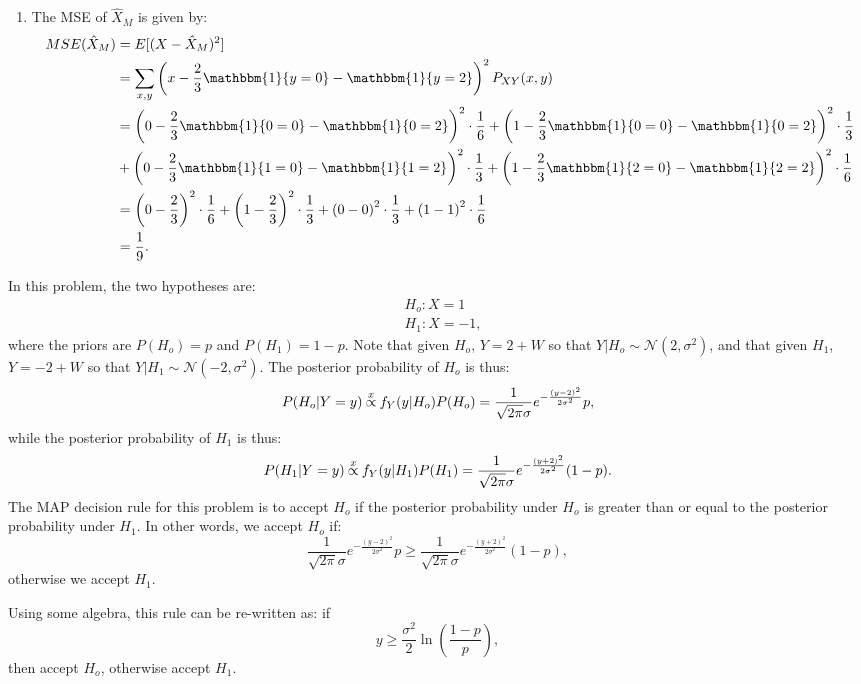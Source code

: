 \begin{problem}{12}
\begin{enumerate}
\item The MSE of $\hat X_M$ is given by:
\begin{align*}
MSE(\hat X_M) & = E[(X-\hat X_M)^2] \\
& = \sum_{x, y} \left ( x-\frac{2}{3} \mathbbm{1} \{ y=0\} - \mathbbm{1} \{ y=2\}\right)^2P_{XY}(x, y) \\
& = \left (0-\frac{2}{3} \mathbbm{1} \{ 0=0\} - \mathbbm{1} \{ 0=2\} \right)^2 \cdot \frac{1}{6}+\left (1-\frac{2}{3} \mathbbm{1} \{ 0=0\} - \mathbbm{1} \{ 0=2\} \right)^2 \cdot \frac{1}{3} \\
&+ \left (0-\frac{2}{3} \mathbbm{1} \{ 1=0\} - \mathbbm{1} \{ 1=2\} \right)^2 \cdot \frac{1}{3} + \left (1-\frac{2}{3} \mathbbm{1} \{ 2=0\} - \mathbbm{1} \{ 2=2\} \right)^2 \cdot \frac{1}{6} \\
& = \left(0-\frac{2}{3} \right)^2\cdot \frac{1}{6}+\left(1-\frac{2}{3} \right)^2\cdot \frac{1}{3}+\left(0-0 \right)^2\cdot \frac{1}{3}+\left(1-1 \right)^2\cdot \frac{1}{6} \\
& = \frac{1}{9}.
\end{align*}



\end{enumerate}
\end{problem}

\begin{problem}{13}  In this problem, the two hypotheses are:
\begin{align*}
&H_o: X=1 \\
&H_1:X=-1,
\end{align*}
where the priors are $P(H_o)=p$ and $P(H_1)=1-p$.  Note that given $H_o$, $Y= 2 +W$ so that $Y|H_o \sim \mathcal N(2, \sigma^2)$, and that given $H_1$, $Y= -2 +W$ so that $Y|H_1 \sim \mathcal N(-2, \sigma^2)$.  The posterior probability of $H_o$ is thus:
\begin{equation*}
P(H_o|Y=y) \propof{x} f_Y(y|H_o)P(H_o) = \frac{1}{\sqrt{2\pi}\sigma}e^{-\frac{(y-2)^2}{2\sigma^2}}p,
\end{equation*}
while the posterior probability of $H_1$ is thus:
\begin{equation*}
P(H_1|Y=y) \propof{x} f_Y(y|H_1)P(H_1) = \frac{1}{\sqrt{2\pi}\sigma}e^{-\frac{(y+2)^2}{2\sigma^2}}(1-p).
\end{equation*}
The MAP decision rule for this problem is to accept $H_o$ if the posterior probability under $H_o$ is greater than or equal to the posterior probability under $H_1$.  In other words, we accept $H_o$ if:
\begin{equation*}
 \frac{1}{\sqrt{2\pi}\sigma}e^{-\frac{(y-2)^2}{2\sigma^2}}p \ge \frac{1}{\sqrt{2\pi}\sigma}e^{-\frac{(y+2)^2}{2\sigma^2}}(1-p),
\end{equation*}
otherwise we accept $H_1$.

Using some algebra, this rule can be re-written as: if 
\begin{equation*}
y \ge \frac{\sigma^2}{2} \ln \left(\frac{1-p}{p} \right),
\end{equation*}
then accept $H_o$, otherwise accept $H_1$.


\end{problem}



